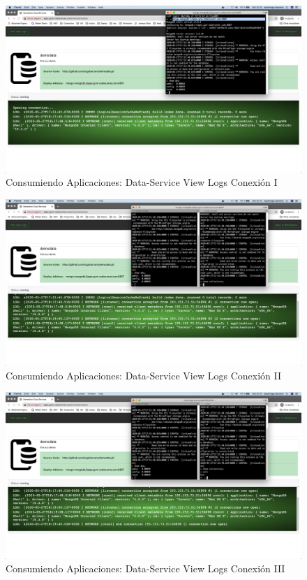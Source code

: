 \documentclass[a4paper,11pt]{book}
\begin{document}
\begin{figure}[H]
\centering
\includegraphics[scale=0.2]{imagenes/casouso/1_14.png}
\caption{  Consumiendo Aplicaciones: Data-Service View Logs Conexión I  }
\end{figure}

\begin{figure}[H]
\centering
\includegraphics[scale=0.2]{imagenes/casouso/1_15.png}
\caption{  Consumiendo Aplicaciones: Data-Service View Logs Conexión II }
\end{figure}

\begin{figure}[H]
\centering
\includegraphics[scale=0.2]{imagenes/casouso/1_16.png}
\caption{ Consumiendo Aplicaciones: Data-Service View Logs Conexión III  }
\end{figure}
\end{document}
